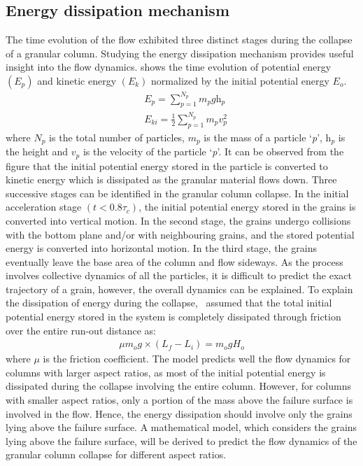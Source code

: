 \subsection{Energy dissipation mechanism}
\label{sec:energy}
The time evolution of the flow exhibited three distinct stages during the 
collapse of a granular column. Studying the energy dissipation mechanism 
provides useful insight into the flow dynamics. %
shows 
the time evolution of potential energy $(E_{p})$ and kinetic energy $(E_{k})$ 
normalized by the initial potential energy $E_{o}$.
\begin{align}
& 
\textit{E}_{\textit{p}}=\sum\limits_{\textit{p}=1}^{\textit{N}_{p}}{\textit{m}_{p}\textit{g}\textit{h}_{p}}
 \\
& 
\textit{E}_{\textit{ki}}=\frac{1}{2}\sum\limits_{\textit{p}=1}^{\textit{N}_{p}}{\textit{m}_{p}\textit{v}_{\textit{p}}^{2}}
\end{align}
where $\textit{N}_{p}$ is the total number of particles, $\textit{m}_{p}$ is 
the mass of a particle `\textit{p}', $\textit{h}_{p}$ is the height and 
$\textit{v}_{p}$ is the velocity of the particle `\textit{p}'. It can be 
observed from the figure that the initial potential energy stored in the 
particle is converted to kinetic energy which is dissipated as the granular 
material flows down. Three successive stages can be identified in the granular 
column collapse. In the initial acceleration stage $(\textit{t}<0.8\tau_{c})$, 
the initial potential energy stored in the grains is converted into vertical 
motion. In the second stage, the grains undergo collisions with the bottom 
plane and/or with neighbouring grains, and the stored potential energy is 
converted into horizontal motion. In the third stage, the grains eventually 
leave the base area of the column and flow sideways. As the process involves 
collective dynamics of all the particles, it is difficult to predict the exact 
trajectory of a grain, however, the overall dynamics can be explained. To 
explain the dissipation of energy during the collapse,~\citet{Staron2005} 
assumed that the total initial potential energy stored in the system is 
completely dissipated through friction over the entire run-out distance as:
\begin{align}
\mu \textit{m}_{o}g \times (L_{f}-L_{i}) = \textit{m}_{o}g \textit{H}_{o}
\end{align}
where $\mu$ is the friction coefficient. The model predicts well the flow 
dynamics for columns with larger aspect ratios, as most of the initial 
potential energy is dissipated during the collapse involving the entire column. 
However, for columns with smaller aspect ratios, only a portion of the mass 
above the failure surface is involved in the flow. Hence, the energy 
dissipation should involve only the grains lying above the failure surface. A 
mathematical model, which considers the grains lying above the failure surface, 
will be derived to predict the flow dynamics of the granular column collapse 
for different aspect ratios. 

